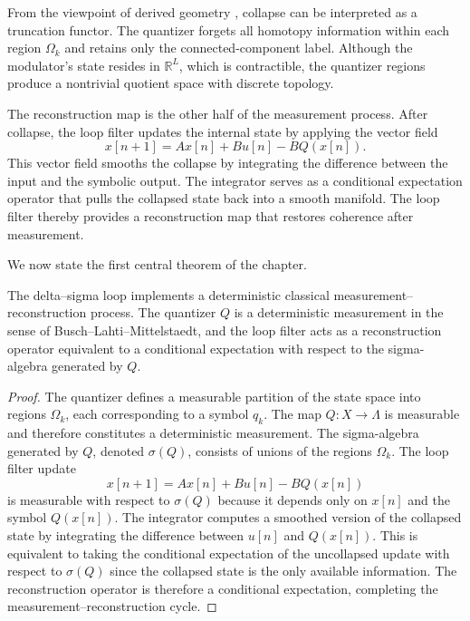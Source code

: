 From the viewpoint of derived geometry \cite{toen2008homotopical, lurie2009higher}, collapse can be interpreted as a truncation functor. The quantizer forgets all homotopy information within each region $\Omega_{k}$ and retains only the connected-component label. Although the modulator’s state resides in $\mathbb{R}^{L}$, which is contractible, the quantizer regions produce a nontrivial quotient space with discrete topology.

The reconstruction map is the other half of the measurement process. After collapse, the loop filter updates the internal state by applying the vector field
\[
x[n+1] = A x[n] + B u[n] - B Q(x[n]).
\]
This vector field smooths the collapse by integrating the difference between the input and the symbolic output. The integrator serves as a conditional expectation operator that pulls the collapsed state back into a smooth manifold. The loop filter thereby provides a reconstruction map that restores coherence after measurement.

We now state the first central theorem of the chapter.

\begin{theorem}
The delta--sigma loop implements a deterministic classical measurement--reconstruction process. The quantizer $Q$ is a deterministic measurement in the sense of Busch--Lahti--Mittelstaedt, and the loop filter acts as a reconstruction operator equivalent to a conditional expectation with respect to the sigma-algebra generated by $Q$.
\end{theorem}

\begin{proof}
The quantizer defines a measurable partition of the state space into regions $\Omega_{k}$, each corresponding to a symbol $q_{k}$. The map $Q : X \to \Lambda$ is measurable and therefore constitutes a deterministic measurement. The sigma-algebra generated by $Q$, denoted $\sigma(Q)$, consists of unions of the regions $\Omega_{k}$. The loop filter update
\[
x[n+1] = A x[n] + B u[n] - B Q(x[n])
\]
is measurable with respect to $\sigma(Q)$ because it depends only on $x[n]$ and the symbol $Q(x[n])$. The integrator computes a smoothed version of the collapsed state by integrating the difference between $u[n]$ and $Q(x[n])$. This is equivalent to taking the conditional expectation of the uncollapsed update with respect to $\sigma(Q)$ since the collapsed state is the only available information. The reconstruction operator is therefore a conditional expectation, completing the measurement--reconstruction cycle.
\end{proof}

